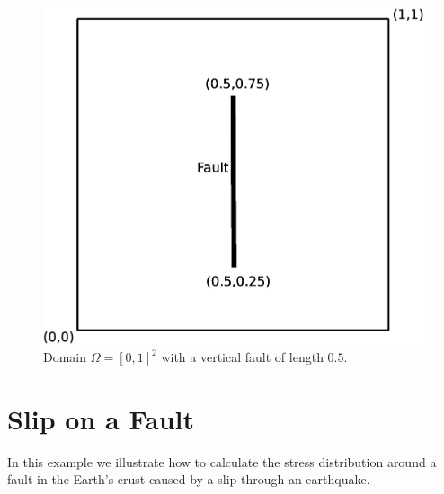 \begin{figure} [ht]
\centerline{\includegraphics[width=\figwidth]{figures/Slip1}}
\caption{Domain $\Omega=[0,1]^2$ with a vertical fault of length $0.5$.}
\label{fig:slip.1}
\end{figure}

\section{Slip on a Fault}
\label{Slip CHAP}

In this example we illustrate how to calculate the stress distribution around a fault  in the 
Earth's crust caused by a slip  through an earthquake.

